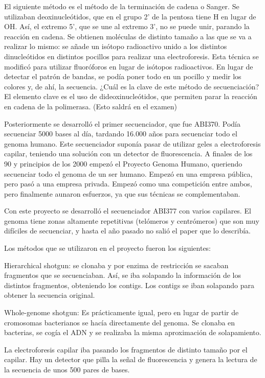 El siguiente método es el método de la terminación de cadena o Sanger. Se utilizaban deoxinucleótidos, que en el grupo 2' de la pentosa tiene H en lugar de OH. Así, el extremo 5', que se une al extremo 3', no se puede unir, parando la reacción en cadena. Se obtienen moléculas de distinto tamaño a las que se va a realizar lo mismo: se añade un isótopo radioactivo unido a los distintos dinucleótidos en distintos pocillos para realizar una electroforesis. Esta técnica se modificó para utilizar fluoróforos en lugar de isótopos radioactivos. En lugar de detectar el patrón de bandas, se podía poner todo en un pocillo y medir los colores y, de ahí, la secuencia. 
¿Cuál es la clave de este método de secuenciación? El elemento clave es el uso de dideoxinucleótidos, que permiten parar la reacción en cadena de la polimerasa. (Esto saldrá en el examen)

Posteriormente se desarrolló el primer secuenciador, que fue ABI370. Podía secuenciar 5000 bases al día, tardando 16.000 años para secuenciar todo el genoma humano. Este secuenciador suponía pasar de utilizar geles a electroforesis capilar, teniendo una solución con un detector de fluorescencia. A finales de los 90 y principios de los 2000 empezó el Proyecto Genoma Humano, queriendo secuenciar todo el genoma de un ser humano. Empezó en una empresa pública, pero pasó a una empresa privada. Empezó como una competición entre ambos, pero finalmente aunaron esfuerzos, ya que sus técnicas se complementaban.

Con este proyecto se desarrolló el secuenciador ABI377 con varios capilares. El genoma tiene zonas altamente repetitivas (telómeros y centrómeros) que son muy difíciles de secuenciar, y hasta el año pasado no salió el paper que lo describía.

Los métodos que se utilizaron en el proyecto fueron los siguientes:

Hierarchical shotgun:
se clonaba y por enzima de restricción se sacaban fragmentos que se secuenciaban. Así, se iba solapando la información de los distintos fragmentos, obteniendo los contigs. Los contigs se iban solapando para obtener la secuencia original.

Whole-genome shotgun:
Es prácticamente igual, pero en lugar de partir de cromosomas bacterianos se hacía directamente del genoma. Se clonaba en bacterias, se cogía el ADN y se realizaba la misma aproximación de solapamiento. 

La electroforesis capilar iba pasando los fragmentos de distinto tamaño por el capilar. Hay un detector que pilla la señal de fluorescencia y genera la lectura de la secuencia de unos 500 pares de bases.

